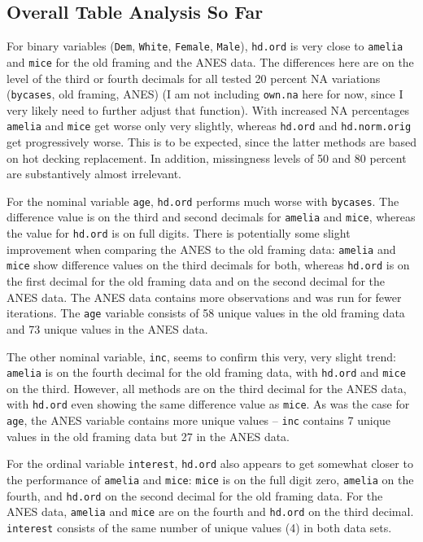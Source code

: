 \documentclass[12pt,econ]{sources/authesis}
\begin{document}
\hypertarget{overall-table-analysis-so-far}{%
\subsection{Overall Table Analysis So Far}\label{overall-table-analysis-so-far}}

For binary variables (\texttt{Dem}, \texttt{White}, \texttt{Female}, \texttt{Male}), \texttt{hd.ord} is very close to \texttt{amelia} and \texttt{mice} for the old framing and the ANES data. The differences here are on the level of the third or fourth decimals for all tested 20 percent NA variations (\texttt{bycases}, old framing, ANES) (I am not including \texttt{own.na} here for now, since I very likely need to further adjust that function). With increased NA percentages \texttt{amelia} and \texttt{mice} get worse only very slightly, whereas \texttt{hd.ord} and \texttt{hd.norm.orig} get progressively worse. This is to be expected, since the latter methods are based on hot decking replacement. In addition, missingness levels of 50 and 80 percent are substantively almost irrelevant.

For the nominal variable \texttt{age}, \texttt{hd.ord} performs much worse with \texttt{bycases}. The difference value is on the third and second decimals for \texttt{amelia} and \texttt{mice}, whereas the value for \texttt{hd.ord} is on full digits. There is potentially some slight improvement when comparing the ANES to the old framing data: \texttt{amelia} and \texttt{mice} show difference values on the third decimals for both, whereas \texttt{hd.ord} is on the first decimal for the old framing data and on the second decimal for the ANES data. The ANES data contains more observations and was run for fewer iterations. The \texttt{age} variable consists of 58 unique values in the old framing data and 73 unique values in the ANES data.

The other nominal variable, \texttt{inc}, seems to confirm this very, very slight trend: \texttt{amelia} is on the fourth decimal for the old framing data, with \texttt{hd.ord} and \texttt{mice} on the third. However, all methods are on the third decimal for the ANES data, with \texttt{hd.ord} even showing the same difference value as \texttt{mice}. As was the case for \texttt{age}, the ANES variable contains more unique values -- \texttt{inc} contains 7 unique values in the old framing data but 27 in the ANES data.

For the ordinal variable \texttt{interest}, \texttt{hd.ord} also appears to get somewhat closer to the performance of \texttt{amelia} and \texttt{mice}: \texttt{mice} is on the full digit zero, \texttt{amelia} on the fourth, and \texttt{hd.ord} on the second decimal for the old framing data. For the ANES data, \texttt{amelia} and \texttt{mice} are on the fourth and \texttt{hd.ord} on the third decimal. \texttt{interest} consists of the same number of unique values (4) in both data sets.
\end{document}

